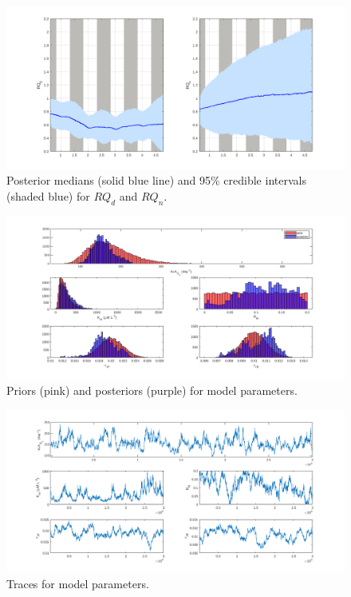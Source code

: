 \documentclass{ruthesis}
\begin{document}
\begin{figure}
	\centerline{\includegraphics[width=1.2\textwidth]{images_microalgae/plots_chris/RQ_d_RQ_n}}
	\caption[.]{Posterior medians (solid blue line) and 95\% credible intervals (shaded blue) for $RQ_d$ and $RQ_n$.}
	\label{fig:micro_exp_RQ_d_RQ_n}
\end{figure}



\begin{figure}
	\centerline{\includegraphics[width=1.3\textwidth]{images_microalgae/plots_chris/modelparameters1}}
	\caption[.]{Priors (pink) and posteriors (purple) for model parameters.}
	\label{fig:micro_exp_parameters_model}
\end{figure}

\begin{figure}
	\centerline{\includegraphics[width=1.3\textwidth]{images_microalgae/plots_chris/modelparameters1_trace}}
	\caption[.]{Traces for model parameters.}
	\label{fig:micro_exp_parameters_model2}
\end{figure}
\end{document}
